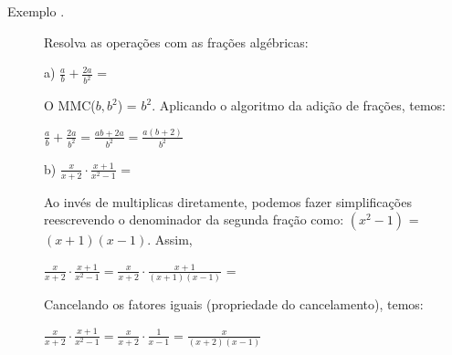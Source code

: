 \begin{description}
\item [Exemplo \thesubsection.\theexemplo] Resolva as operações com as frações algébricas:

{\large a) $\frac{a}{b}+\frac{2a}{b^2}$ =}

O MMC($b,b^2$) = $b^2$. Aplicando o algoritmo da adição de frações, temos:

\begin{center}{\large
$\frac{a}{b}+\frac{2a}{b^2}=\frac{ab+2a}{b^2}=\frac{a(b+2)}{b^2}$
}\end{center}

{\large b) $\frac{x}{x+2} \cdot \frac{x+1}{x^2-1}$ =}

Ao invés de multiplicas diretamente, podemos fazer simplificações reescrevendo o denominador da segunda fração como: $(x^2 - 1)$ = $(x+1)(x-1)$. Assim,

\begin{center}{\large
$\frac{x}{x+2} \cdot \frac{x+1}{x^2-1} = \frac{x}{x+2} \cdot \frac{x+1}{(x+1)(x-1)}$ =
}\end{center}

Cancelando os fatores iguais (propriedade do cancelamento), temos:

\begin{center}{\large
$\frac{x}{x+2} \cdot \frac{x+1}{x^2-1} = \frac{x}{x+2} \cdot \frac{1}{x-1} = \frac{x}{(x+2)(x-1)}$ ~~~~
}\qedsymbol{}\end{center}
\end{description}

